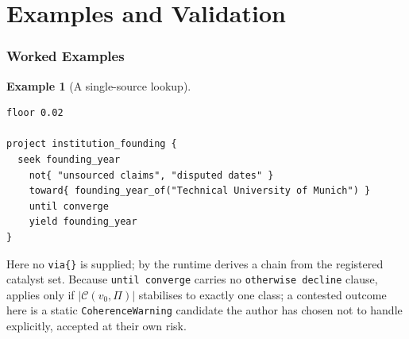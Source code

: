 \documentclass[11pt,twocolumn,a4paper]{article}
\theoremstyle{thmstyle}
\theoremstyle{definition}
\newtheorem{example}[theorem]{Example}
\theoremstyle{remark}
\newcommand{\Proc}{\Pi}
\newcommand{\Cell}{\mathcal{C}}
\newcommand{\abs}[1]{\lvert#1\rvert}
\begin{document}
\part{Examples and Validation}

\section{Worked Examples}
\label{sec:examples}

\begin{example}[A single-source lookup]
\label{ex:single}
\begin{lstlisting}[caption={A surgical single-fact lookup.}]
floor 0.02

project institution_founding {
  seek founding_year
    not{ "unsourced claims", "disputed dates" }
    toward{ founding_year_of("Technical University of Munich") }
    until converge
    yield founding_year
}
\end{lstlisting}
Here no \texttt{via\{\}} is supplied; by  the runtime
derives a chain from the registered catalyst set. Because
\texttt{until converge} carries no \texttt{otherwise decline} clause,
 applies only if $\abs{\Cell(v_0,\Proc)}$ stabilises
to exactly one class; a contested outcome here is a static
\texttt{CoherenceWarning} candidate the author has chosen not to handle
explicitly, accepted at their own risk.
\end{example}
\end{document}
